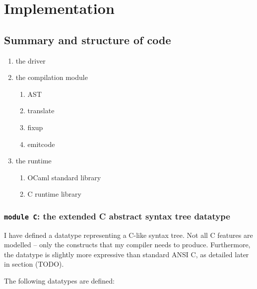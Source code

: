 \documentclass[12pt,a4paper,twoside,openright]{report}
\begin{document}


\chapter{Implementation}

\section{Summary and structure of code}

\begin{enumerate}
  \item the driver
  \item the compilation module
    \begin{enumerate}
      \item AST
      \item translate
      \item fixup
      \item emitcode
    \end{enumerate}
  \item the runtime
    \begin{enumerate}
      \item OCaml standard library
      \item C runtime library
    \end{enumerate}
\end{enumerate}

\subsection{\texttt{module C}: the extended C abstract syntax tree datatype}

I have defined a datatype representing a C-like syntax tree. Not all C features are modelled -- only the constructs that my compiler needs to produce. Furthermore, the datatype is slightly more expressive than standard ANSI C, as detailed later in section (TODO).

The following datatypes are defined:
\end{document}
